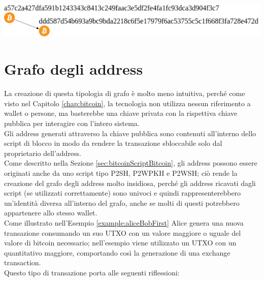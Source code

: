 {\centering
\vspace{5pt}
\includegraphics[scale=0.35]{images/exampleWithGraph/aliceBoxTx.png}
\vspace{10pt}
\par}

\section{Grafo degli address} \label{sec:grafoDegliAddressProblema}
La creazione di questa tipologia di grafo è molto meno intuitiva, perché come visto nel Capitolo \ref{chap:bitcoin}, la tecnologia non utilizza nessun riferimento a wallet o persone, ma basterebbe una chiave privata con la rispettiva chiave pubblica per interagire con l’intero sistema. \\
Gli address generati attraverso la chiave pubblica sono contenuti all’interno dello script di blocco in modo da rendere la transazione sbloccabile solo dal proprietario dell’address. \\
Come descritto nella Sezione \ref{sec:bitcoinScriptBitcoin}, gli address possono essere originati anche da uno script tipo P2SH, P2WPKH e P2WSH; ciò rende la creazione del grafo degli address molto insidiosa, perché gli address ricavati dagli script (se utilizzati correttamente) sono univoci e quindi rappresenterebbero un’identità diversa all’interno del grafo, anche se molti di questi potrebbero appartenere allo stesso wallet. \\
Come illustrato nell’Esempio \ref{example:aliceBobFirst} Alice genera una nuova transazione consumando un suo UTXO con un valore maggiore o uguale del valore di bitcoin necessario; nell'esempio viene utilizzato un UTXO con un quantitativo maggiore, comportando così la generazione di una exchange transaction. \\
Questo tipo di transazione porta alle seguenti riflessioni:

